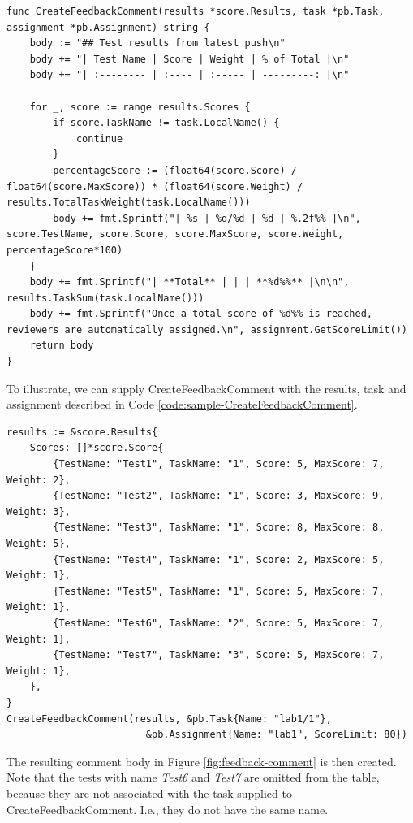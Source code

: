\begin{lstlisting}[caption={The CreateFeedbackComment function}, label={code:CreateFeedbackComment}, language=Golang]
func CreateFeedbackComment(results *score.Results, task *pb.Task, assignment *pb.Assignment) string {
	body := "## Test results from latest push\n"
	body += "| Test Name | Score | Weight | % of Total |\n"
	body += "| :-------- | :---- | :----- | ---------: |\n"

	for _, score := range results.Scores {
		if score.TaskName != task.LocalName() {
			continue
		}
		percentageScore := (float64(score.Score) / float64(score.MaxScore)) * (float64(score.Weight) / results.TotalTaskWeight(task.LocalName()))
		body += fmt.Sprintf("| %s | %d/%d | %d | %.2f%% |\n", score.TestName, score.Score, score.MaxScore, score.Weight, percentageScore*100)
	}
	body += fmt.Sprintf("| **Total** | | | **%d%%** |\n\n", results.TaskSum(task.LocalName()))
	body += fmt.Sprintf("Once a total score of %d%% is reached, reviewers are automatically assigned.\n", assignment.GetScoreLimit())
	return body
}
\end{lstlisting}

To illustrate, we can supply CreateFeedbackComment with the results, task and assignment described in Code \ref{code:sample-CreateFeedbackComment}.
\begin{lstlisting}[caption={Example of a CreateFeedbackComment run}, label={code:sample-CreateFeedbackComment}, language=Golang]
results := &score.Results{
	Scores: []*score.Score{
		{TestName: "Test1", TaskName: "1", Score: 5, MaxScore: 7, Weight: 2},
		{TestName: "Test2", TaskName: "1", Score: 3, MaxScore: 9, Weight: 3},
		{TestName: "Test3", TaskName: "1", Score: 8, MaxScore: 8, Weight: 5},
		{TestName: "Test4", TaskName: "1", Score: 2, MaxScore: 5, Weight: 1},
		{TestName: "Test5", TaskName: "1", Score: 5, MaxScore: 7, Weight: 1},
		{TestName: "Test6", TaskName: "2", Score: 5, MaxScore: 7, Weight: 1},
		{TestName: "Test7", TaskName: "3", Score: 5, MaxScore: 7, Weight: 1},
	},
}
CreateFeedbackComment(results, &pb.Task{Name: "lab1/1"}, 
                        &pb.Assignment{Name: "lab1", ScoreLimit: 80})
\end{lstlisting}

The resulting comment body in Figure \ref{fig:feedback-comment} is then created.
Note that the tests with name \textit{Test6} and \textit{Test7} are omitted from the table, because they are not associated with the task supplied to CreateFeedbackComment.
I.e., they do not have the same name.

